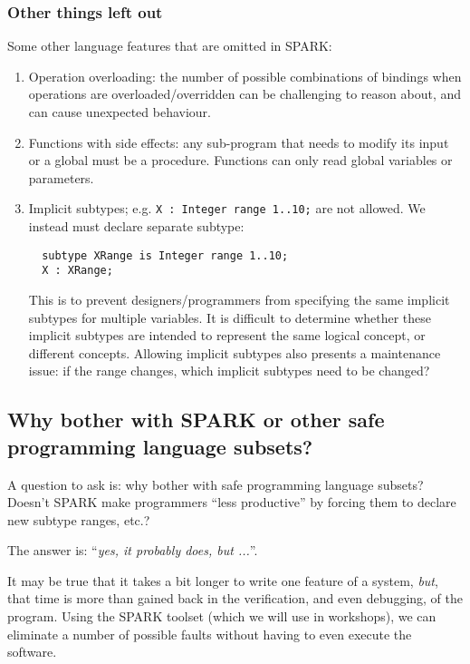\subsubsection*{Other things left out}

Some other language features that are omitted in SPARK:

\begin{enumerate}

 \item Operation overloading: the number of possible combinations of bindings when operations are overloaded/overridden can be challenging to reason about, and can cause unexpected behaviour.

 \item Functions with side effects: any sub-program that needs to modify its input or a global must be a procedure. Functions can only read global variables or parameters.

 \item Implicit subtypes; e.g. \texttt{X : Integer range 1..10;} are not allowed. We instead must declare separate subtype:

\begin{verbatim}
  subtype XRange is Integer range 1..10;
  X : XRange;
\end{verbatim}

 This is to prevent designers/programmers from specifying the same implicit subtypes for multiple variables. It is difficult to determine whether these implicit subtypes are intended to represent the same logical concept, or different concepts. Allowing implicit subtypes also presents a maintenance issue: if the range changes, which implicit subtypes need to be changed?

\end{enumerate}
 

\subsection{Why bother with SPARK or other safe programming language subsets?}

A question to ask is: why bother with safe programming language subsets? Doesn't SPARK make programmers ``less productive'' by forcing them to declare new subtype ranges, etc.?

The answer is: ``\emph{yes, it probably does, but ...}''. 

It may be true that it takes a bit longer to write one feature of a system, \emph{but}, that time is more than gained back in the verification, and even debugging, of the program. Using the SPARK toolset (which we will use in workshops), we can eliminate a number of possible faults without having to even execute the software.

